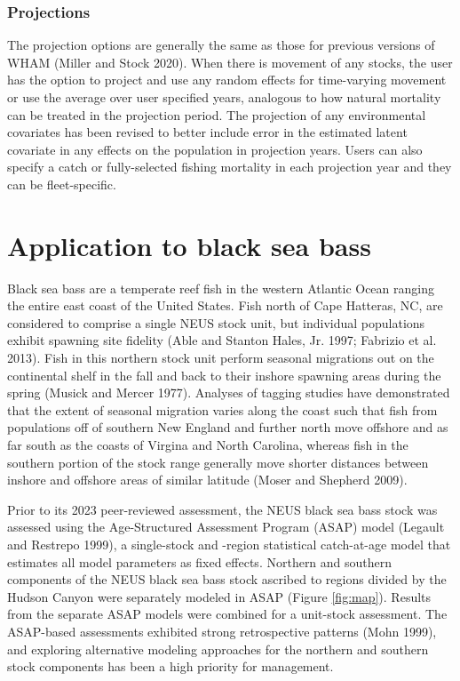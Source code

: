 \documentclass[
]{article}
\begin{document}
\hypertarget{projections}{%
\subsubsection*{Projections}\label{projections}}

The projection options are generally the same as those for previous versions of WHAM (Miller and Stock 2020). When there is movement of any stocks, the user has the option to project and use any random effects for time-varying movement or use the average over user specified years, analogous to how natural mortality can be treated in the projection period. The projection of any environmental covariates has been revised to better include error in the estimated latent covariate in any effects on the population in projection years. Users can also specify a catch or fully-selected fishing mortality in each projection year and they can be fleet-specific.

\hypertarget{application-to-black-sea-bass}{%
\section*{Application to black sea bass}\label{application-to-black-sea-bass}}

Black sea bass are a temperate reef fish in the western Atlantic Ocean ranging the entire east coast of the United States. Fish north of Cape Hatteras, NC, are considered to comprise a single NEUS stock unit, but individual populations exhibit spawning site fidelity (Able and Stanton Hales, Jr. 1997; Fabrizio et al. 2013). Fish in this northern stock unit perform seasonal migrations out on the continental shelf in the fall and back to their inshore spawning areas during the spring (Musick and Mercer 1977). Analyses of tagging studies have demonstrated that the extent of seasonal migration varies along the coast such that fish from populations off of southern New England and further north move offshore and as far south as the coasts of Virgina and North Carolina, whereas fish in the southern portion of the stock range generally move shorter distances between inshore and offshore areas of similar latitude (Moser and Shepherd 2009).

Prior to its 2023 peer-reviewed assessment, the NEUS black sea bass stock was assessed using the Age-Structured Assessment Program (ASAP) model (Legault and Restrepo 1999), a single-stock and -region statistical catch-at-age model that estimates all model parameters as fixed effects. Northern and southern components of the NEUS black sea bass stock ascribed to regions divided by the Hudson Canyon were separately modeled in ASAP (Figure \ref{fig:map}). Results from the separate ASAP models were combined for a unit-stock assessment. The ASAP-based assessments exhibited strong retrospective patterns (Mohn 1999), and exploring alternative modeling approaches for the northern and southern stock components has been a high priority for management.
\end{document}
